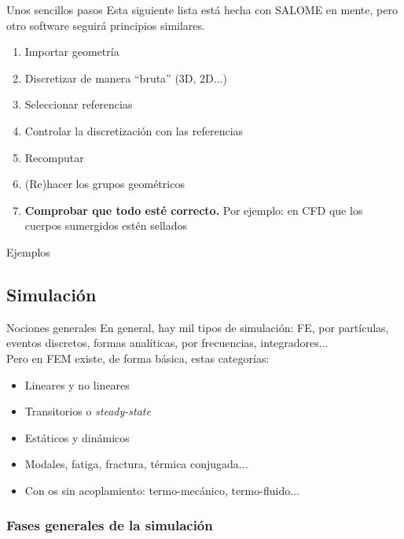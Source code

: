 \documentclass[12pt]{beamer}
\begin{document}
\begin{frame}{Unos sencillos pasos}
	Esta siguiente lista está hecha con SALOME en mente, pero otro software seguirá principios similares.
	\begin{enumerate}
		\item Importar geometría
		\item Discretizar de manera ``bruta'' (3D, 2D...)
		\item Seleccionar referencias
		\item Controlar la discretización con las referencias
		\item Recomputar
		\item (Re)hacer los grupos geométricos
		\item \textbf{Comprobar que todo esté correcto.} Por ejemplo: en CFD que los cuerpos sumergidos estén sellados
	\end{enumerate}
\end{frame}

\begin{frame}{Ejemplos}
	
\end{frame}

\subsection{Simulación}

\begin{frame}{Nociones generales}
	En general, hay mil tipos de simulación: FE, por partículas, eventos discretos, formas analíticas, por frecuencias, integradores... \\
	Pero en FEM existe, de forma básica, estas categorías:
	\begin{itemize}
		\item Lineares y no lineares
		\item Transitorios o \textit{steady-state}
		\item Estáticos y dinámicos
		\item Modales, fatiga, fractura, térmica conjugada...
		\item Con os sin acoplamiento: termo-mecánico, termo-fluido...
	\end{itemize}
\end{frame}

\subsubsection{Fases generales de la simulación}
\end{document}
